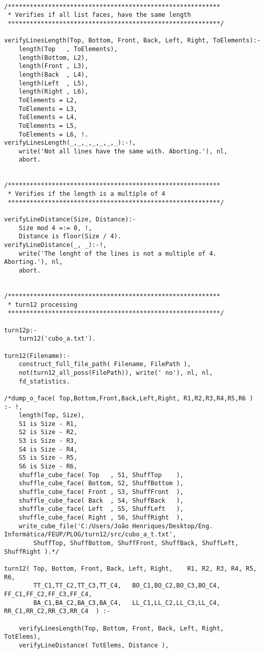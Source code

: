 \begin{lstlisting}
	
/**********************************************************
 * Verifies if all list faces, have the same length
 **********************************************************/
 
verifyLinesLength(Top, Bottom, Front, Back, Left, Right, ToElements):-
	length(Top   , ToElements),
	length(Bottom, L2),
	length(Front , L3),
	length(Back  , L4),
	length(Left  , L5),
	length(Right , L6),
	ToElements = L2,
	ToElements = L3,
	ToElements = L4,
	ToElements = L5,
	ToElements = L6, !.
verifyLinesLength(_,_,_,_,_,_,_):-!,
	write('Not all lines have the same with. Aborting.'), nl,
	abort.

	
/**********************************************************
 * Verifies if the length is a multiple of 4
 **********************************************************/
 
verifyLineDistance(Size, Distance):-
	Size mod 4 =:= 0, !,
	Distance is floor(Size / 4).
verifyLineDistance(_, _):-!,
	write('The lenght of the lines is not a multiple of 4. Aborting.'), nl,
	abort.

	
/**********************************************************
 * turn12 processing
 **********************************************************/

turn12p:-
	turn12('cubo_a.txt').
	
turn12(Filename):-
	construct_full_file_path( Filename, FilePath ),
	not(turn12_all_poss(FilePath)), write(' no'), nl, nl,
	fd_statistics.
 
/*dump_o_face( Top,Bottom,Front,Back,Left,Right, R1,R2,R3,R4,R5,R6 ) :- !,
	length(Top, Size),
	S1 is Size - R1,
	S2 is Size - R2,
	S3 is Size - R3,
	S4 is Size - R4,
	S5 is Size - R5,
	S6 is Size - R6,
	shuffle_cube_face( Top   , S1, ShuffTop    ),
	shuffle_cube_face( Bottom, S2, ShuffBottom ),
	shuffle_cube_face( Front , S3, ShuffFront  ),
	shuffle_cube_face( Back  , S4, ShuffBack   ),
	shuffle_cube_face( Left  , S5, ShuffLeft   ),
	shuffle_cube_face( Right , S6, ShuffRight  ),
	write_cube_file('C:/Users/João Henriques/Desktop/Eng. Informática/FEUP/PLOG/turn12/src/cubo_a_t.txt',
		ShuffTop, ShuffBottom, ShuffFront, ShuffBack, ShuffLeft, ShuffRight ).*/

turn12( Top, Bottom, Front, Back, Left, Right,    R1, R2, R3, R4, R5, R6,
		TT_C1,TT_C2,TT_C3,TT_C4,   BO_C1,BO_C2,BO_C3,BO_C4,    FF_C1,FF_C2,FF_C3,FF_C4,
		BA_C1,BA_C2,BA_C3,BA_C4,   LL_C1,LL_C2,LL_C3,LL_C4,    RR_C1,RR_C2,RR_C3,RR_C4  ) :-
	
	verifyLinesLength(Top, Bottom, Front, Back, Left, Right, TotElems),
	verifyLineDistance( TotElems, Distance ),


\end{lstlisting}
